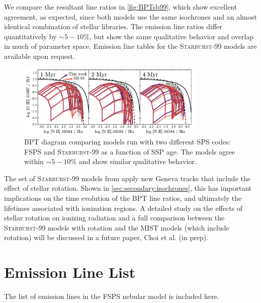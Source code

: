 \documentclass[trackchanges, twocolumn, tighten]{aastex61}
\newcommand{\Fig}[1]{\autoref{fig:#1}}
\newcommand{\Sec}[1]{\autoref{sec:#1}}
\newcommand{\FSPS}{{\sc FSPS}\xspace}
\newcommand{\SB}{\textsc{Starburst-99}\xspace}
\begin{document}
We compare the resultant line ratios in \Fig{BPTsb99}, which show excellent agreement, as expected, since both models use the same isochrones and an almost identical combination of stellar libraries. The emission line ratios differ quantitatively by $\sim5-10\%$, but show the same qualitative behavior and overlap in much of parameter space. Emission line tables for the \SB models are available upon request.

\begin{figure} [ht!]
  \begin{centering}
    \includegraphics[width=0.8\textwidth]{f30.pdf}
    \caption{BPT diagram comparing models run with two different SPS codes: FSPS and \SB as a function of SSP age. The models agree within $\sim5-10\%$ and show similar qualitative behavior.}
    \label{fig:BPTsb99}
  \end{centering}
\end{figure}

The set of \SB models from \citet{Levesque14} apply new Geneva tracks that include the effect of stellar rotation. Shown in \Sec{secondary:isochrones}, this has important implications on the time evolution of the BPT line ratios, and ultimately the lifetimes associated with ionization regions. A detailed study on the effects of stellar rotation on ionizing radiation and a full comparison between the \SB models with rotation and the MIST models (which include rotation) will be discussed in a future paper, Choi et al. (in prep).

\section{Emission Line List}\label{sec:appendix}
The list of emission lines in the \FSPS nebular model is included here.
\end{document}
